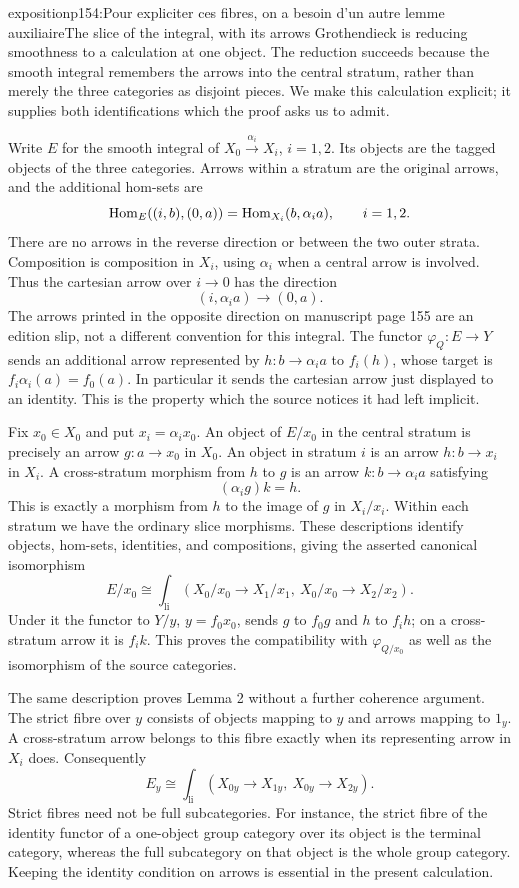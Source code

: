 \begin{dcomment}{exposition}{p154:Pour expliciter ces fibres, on a besoin d'un autre lemme auxiliaire}{The slice of the integral, with its arrows}
Grothendieck is reducing smoothness to a calculation at one object. The reduction succeeds because the smooth integral remembers the arrows into the central stratum, rather than merely the three categories as disjoint pieces. We make this calculation explicit; it supplies both identifications which the proof asks us to admit.

Write $E$ for the smooth integral of $X_0\xrightarrow{\alpha_i}X_i$, $i=1,2$. Its objects are the tagged objects of the three categories. Arrows within a stratum are the original arrows, and the additional hom-sets are
\[
 \mathrm{Hom}_E((i,b),(0,a))=\mathrm{Hom}_{X_i}(b,\alpha_i a),\qquad i=1,2.
\]
There are no arrows in the reverse direction or between the two outer strata. Composition is composition in $X_i$, using $\alpha_i$ when a central arrow is involved. Thus the cartesian arrow over $i\to0$ has the direction
\[
 (i,\alpha_i a)\longrightarrow(0,a).
\]
The arrows printed in the opposite direction on manuscript page 155 are an edition slip, not a different convention for this integral. The functor $\varphi_Q:E\to Y$ sends an additional arrow represented by $h:b\to\alpha_i a$ to $f_i(h)$, whose target is $f_i\alpha_i(a)=f_0(a)$. In particular it sends the cartesian arrow just displayed to an identity. This is the property which the source notices it had left implicit.

Fix $x_0\in X_0$ and put $x_i=\alpha_i x_0$. An object of $E/x_0$ in the central stratum is precisely an arrow $g:a\to x_0$ in $X_0$. An object in stratum $i$ is an arrow $h:b\to x_i$ in $X_i$. A cross-stratum morphism from $h$ to $g$ is an arrow $k:b\to\alpha_i a$ satisfying
\[
       (\alpha_i g)k=h.
\]
This is exactly a morphism from $h$ to the image of $g$ in $X_i/x_i$. Within each stratum we have the ordinary slice morphisms. These descriptions identify objects, hom-sets, identities, and compositions, giving the asserted canonical isomorphism
\[
 E/x_0\cong\int_{\mathrm{li}}
       (X_0/x_0\longrightarrow X_1/x_1,\ X_0/x_0\longrightarrow X_2/x_2).
\]
Under it the functor to $Y/y$, $y=f_0x_0$, sends $g$ to $f_0g$ and $h$ to $f_i h$; on a cross-stratum arrow it is $f_i k$. This proves the compatibility with $\varphi_{Q/x_0}$ as well as the isomorphism of the source categories.

The same description proves Lemma 2 without a further coherence argument. The strict fibre over $y$ consists of objects mapping to $y$ and arrows mapping to $1_y$. A cross-stratum arrow belongs to this fibre exactly when its representing arrow in $X_i$ does. Consequently
\[
 E_y\cong\int_{\mathrm{li}}(X_{0y}\longrightarrow X_{1y},\ X_{0y}\longrightarrow X_{2y}).
\]
Strict fibres need not be full subcategories. For instance, the strict fibre of the identity functor of a one-object group category over its object is the terminal category, whereas the full subcategory on that object is the whole group category. Keeping the identity condition on arrows is essential in the present calculation.


\end{dcomment}
